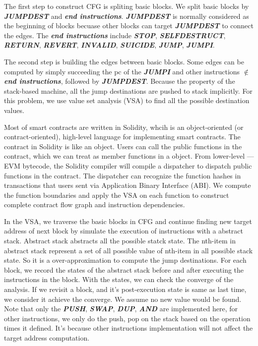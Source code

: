 \documentclass{article}
\begin{document}
The first step to construct CFG is spliting basic blocks. We split basic blocks by \textbf{\textit{JUMPDEST}} and \textbf{\textit{end instructions}}. \textbf{\textit{JUMPDEST}} is normally considered as the beginning of blocks becuase other blocks can target \textbf{\textit{JUMPDEST}} to connect the edges. The \textbf{\textit{end instructions}} include \textbf{\textit{STOP}}, \textbf{\textit{SELFDESTRUCT}}, \textbf{\textit{RETURN}}, \textbf{\textit{REVERT}}, \textbf{\textit{INVALID}}, \textbf{\textit{SUICIDE}}, \textbf{\textit{JUMP}}, \textbf{\textit{JUMPI}}.

The second step is building the edges between basic blocks. Some edges can be computed by simply succeeding the pc of the \textbf{\textit{JUMPI}} and other instructions $\notin$ \textbf{\textit{end instructions}}, followed by \textbf{\textit{JUMPDEST}}. Because the property of the stack-based machine, all the jump destinations are pushed to stack implicitly. For this problem, we use value set analysis (VSA) to find all the possible destination values.

Most of smart contracts are written in Solidity, whcih is an object-oriented (or contract-oriented), high-level language for implementing smart contracts. The contract in Solidity is like an object. Users can call the public functions in the contract, which we can treat as member functions in a object. From lower-level --- EVM bytecode, the Solidity compiler will compile a dispatcher to dispatch public functions in the contract. The dispatcher can recognize the function hashes in transactions that users sent via Application Binary Interface (ABI). We compute the function boundaries and apply the VSA on each function to construct complete contract flow graph and instruction dependencies.



In the VSA, we traverse the basic blocks in CFG and continue finding new target address of next block by simulate the execution of instructions with a abstract stack. Abstract stack abstracts all the possible statck state. The nth-item in abstract stack represent a set of all possible value of nth-item in all possible stack state. So it is a over-approximation to compute the jump destinations. For each block, we record the states of the abstract stack before and after executing the instructions in the block. With the states, we can check the converge of the analysis. If we revisit a block, and it's post-execution state is same as last time, we consider it achieve the converge. We assume no new value would be found. Note that only the \textbf{\textit{PUSH}}, \textbf{\textit{SWAP}}, \textbf{\textit{DUP}}, \textbf{\textit{AND}} are implemented here, for other instructions, we only do the push, pop on the stack based on the operation times it defined. It's because other instructions implementation will not affect the target address computation.
\end{document}
